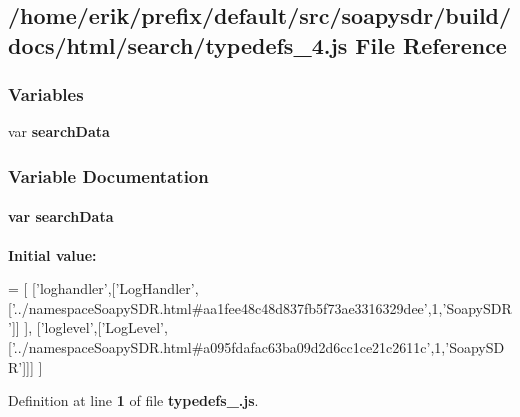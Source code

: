 \subsection{/home/erik/prefix/default/src/soapysdr/build/docs/html/search/typedefs\+\_\+4.js File Reference}
\label{typedefs__4_8js}
\subsubsection*{Variables}
\begin{DoxyCompactItemize}
\item 
var {\bf search\+Data}
\end{DoxyCompactItemize}


\subsubsection{Variable Documentation}
\paragraph[{search\+Data}]{\setlength{\rightskip}{0pt plus 5cm}var search\+Data}\label{typedefs__4_8js_ad01a7523f103d6242ef9b0451861231e}
{\bfseries Initial value\+:}
\begin{DoxyCode}
=
[
  [\textcolor{stringliteral}{'loghandler'},[\textcolor{stringliteral}{'LogHandler'},[\textcolor{stringliteral}{'../namespaceSoapySDR.html#aa1fee48c48d837fb5f73ae3316329dee'},1,\textcolor{stringliteral}{'SoapySDR'}]]
      ],
  [\textcolor{stringliteral}{'loglevel'},[\textcolor{stringliteral}{'LogLevel'},[\textcolor{stringliteral}{'../namespaceSoapySDR.html#a095fdafac63ba09d2d6cc1ce21c2611c'},1,\textcolor{stringliteral}{'SoapySDR'}]]]
]
\end{DoxyCode}


Definition at line {\bf 1} of file {\bf typedefs\+\_.\+js}.

